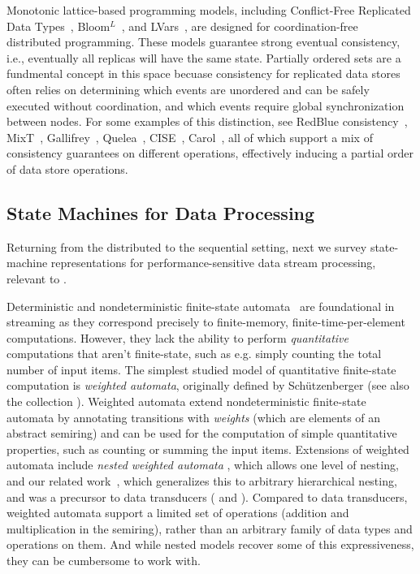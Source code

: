 Monotonic lattice-based programming models,
including Conflict-Free Replicated Data Types~\cite{shapiro2011conflict},
Bloom$^L$~\cite{conway12},
and LVars~\cite{lvars13,lvars14},
are designed for coordination-free distributed programming.
These models guarantee strong eventual consistency,
i.e., eventually all replicas will have the same state.
Partially ordered sets are a fundmental concept in this space
becuase consistency for replicated data stores
often relies on determining which events are unordered and can be
safely executed without coordination,
and which events require global synchronization between nodes.
For some examples of this distinction,
see RedBlue consistency~\cite{li2012making},
MixT~\cite{milano2018mixt},
Gallifrey~\cite{milano2019tour},
Quelea~\cite{sivaramakrishnan2015declarative},
CISE~\cite{gotsman16},
Carol~\cite{lewchenko2019sequential},
all of which support a mix of consistency guarantees on different operations,
effectively inducing a partial order of data store operations.

\subsection{State Machines for Data Processing}

Returning from the distributed to the sequential setting,
next we survey state-machine representations for performance-sensitive
data stream processing, relevant to .

Deterministic and nondeterministic finite-state automata~\cite{rabin1959finite} are foundational in streaming as they correspond precisely to finite-memory, finite-time-per-element computations. However, they lack the ability to perform \emph{quantitative} computations that aren't finite-state, such as e.g. simply counting the total number of input items.
The simplest studied model of quantitative finite-state computation is
\emph{weighted automata}, originally defined by Schützenberger \cite{S1961WA} (see also the collection \cite{DKV2009HWA}).
Weighted automata extend nondeterministic finite-state automata by annotating transitions with \emph{weights} (which are elements of an abstract semiring) and can be used for the computation of simple quantitative properties, such as counting or summing the input items.
Extensions of weighted automata include \emph{nested weighted automata} \cite{CHO2015NWA}, which allows one level of nesting, and our related work~, which generalizes this to arbitrary hierarchical nesting, and was a precursor to data transducers ( and ).
Compared to data transducers, weighted automata support a limited set of operations (addition and multiplication in the semiring), rather than an arbitrary family of data types and operations on them.
And while nested models recover some of this expressiveness, they can be cumbersome to work with.

